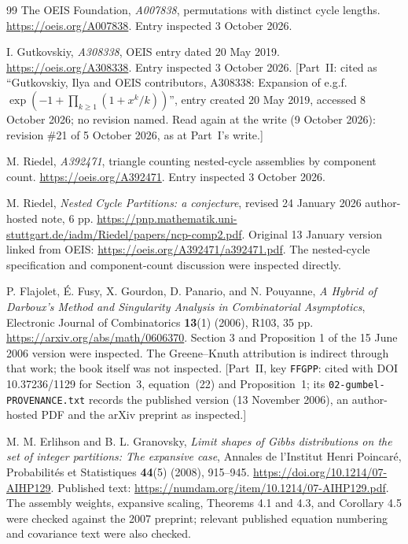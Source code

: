 \documentclass[11pt,letterpaper]{article}
\numberwithin{equation}{section}
\theoremstyle{remark}\newtheorem{remark}[theorem]{Remark}
\newcommand{\file}[1]{\nolinkurl{#1}}
\theoremstyle{definition}\newtheorem{definition}[theorem]{Definition}\theoremstyle{plain}
\begin{document}
\begin{thebibliography}{99}
The OEIS Foundation, \emph{A007838}, permutations with distinct cycle
lengths. \url{https://oeis.org/A007838}. Entry inspected 3 October 2026.

I. Gutkovskiy, \emph{A308338}, OEIS entry dated 20 May 2019.
\url{https://oeis.org/A308338}. Entry inspected 3 October 2026.
[Part~II: cited as ``Gutkovskiy, Ilya and OEIS contributors, A308338: Expansion of e.g.f.
$\exp(-1+\prod_{k\geq1}(1+x^k/k))$'', entry created 20 May 2019, accessed 8 October 2026; no
revision named. Read again at the write (9 October 2026): revision \#21 of 5 October 2026, as at Part~I's write.]

M. Riedel, \emph{A392471}, triangle counting nested-cycle assemblies
by component count. \url{https://oeis.org/A392471}.
Entry inspected 3 October 2026.

M. Riedel, \emph{Nested Cycle Partitions: a conjecture}, revised 24 January 2026
author-hosted note, 6 pp.
\url{https://pnp.mathematik.uni-stuttgart.de/iadm/Riedel/papers/ncp-comp2.pdf}.
Original 13 January version linked from OEIS:
\url{https://oeis.org/A392471/a392471.pdf}.
The nested-cycle specification and component-count discussion were
inspected directly.

P. Flajolet, \'E. Fusy, X. Gourdon, D. Panario, and N. Pouyanne,
\emph{A Hybrid of Darboux's Method and Singularity Analysis in
Combinatorial Asymptotics}, Electronic Journal of Combinatorics
\textbf{13}(1) (2006), R103, 35 pp.
\url{https://arxiv.org/abs/math/0606370}.
Section 3 and Proposition 1 of the 15 June 2006 version were inspected.
The Greene--Knuth attribution is indirect through that work; the book
itself was not inspected.
[Part~II, key \texttt{FFGPP}: cited with DOI 10.37236/1129 for Section~3, equation~(22) and
Proposition~1; its \file{02-gumbel-PROVENANCE.txt} records the published version (13 November 2006),
an author-hosted PDF and the arXiv preprint as inspected.]

M. M. Erlihson and B. L. Granovsky,
\emph{Limit shapes of Gibbs distributions on the set of integer
partitions: The expansive case}, Annales de l'Institut Henri Poincar\'e,
Probabilit\'es et Statistiques \textbf{44}(5) (2008), 915--945.
\url{https://doi.org/10.1214/07-AIHP129}.
Published text: \url{https://numdam.org/item/10.1214/07-AIHP129.pdf}.
The assembly weights, expansive scaling, Theorems 4.1 and 4.3, and
Corollary 4.5 were checked against the 2007 preprint; relevant published
equation numbering and covariance text were also checked.


\end{thebibliography}
\end{document}

